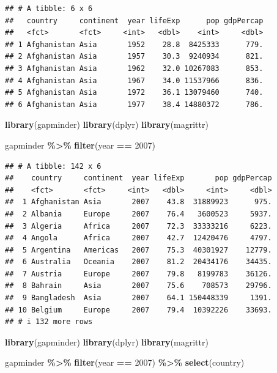 \documentclass[
]{book}
\newenvironment{Shaded}{\begin{snugshade}}{\end{snugshade}}
\newcommand{\DecValTok}[1]{\textcolor[rgb]{0.00,0.00,0.81}{#1}}
\newcommand{\FunctionTok}[1]{\textcolor[rgb]{0.13,0.29,0.53}{\textbf{#1}}}
\newcommand{\NormalTok}[1]{#1}
\newcommand{\SpecialCharTok}[1]{\textcolor[rgb]{0.81,0.36,0.00}{\textbf{#1}}}
\theoremstyle{definition}
\theoremstyle{definition}
\theoremstyle{definition}
\theoremstyle{definition}
\theoremstyle{remark}
\begin{document}
\begin{verbatim}
## # A tibble: 6 x 6
##   country     continent  year lifeExp      pop gdpPercap
##   <fct>       <fct>     <int>   <dbl>    <int>     <dbl>
## 1 Afghanistan Asia       1952    28.8  8425333      779.
## 2 Afghanistan Asia       1957    30.3  9240934      821.
## 3 Afghanistan Asia       1962    32.0 10267083      853.
## 4 Afghanistan Asia       1967    34.0 11537966      836.
## 5 Afghanistan Asia       1972    36.1 13079460      740.
## 6 Afghanistan Asia       1977    38.4 14880372      786.
\end{verbatim}

\begin{Shaded}
\begin{Highlighting}[]
\FunctionTok{library}\NormalTok{(gapminder)}
\FunctionTok{library}\NormalTok{(dplyr)}
\FunctionTok{library}\NormalTok{(magrittr)}

\NormalTok{gapminder }\SpecialCharTok{\%\textgreater{}\%}
  \FunctionTok{filter}\NormalTok{(year }\SpecialCharTok{==} \DecValTok{2007}\NormalTok{)}
\end{Highlighting}
\end{Shaded}

\begin{verbatim}
## # A tibble: 142 x 6
##    country     continent  year lifeExp       pop gdpPercap
##    <fct>       <fct>     <int>   <dbl>     <int>     <dbl>
##  1 Afghanistan Asia       2007    43.8  31889923      975.
##  2 Albania     Europe     2007    76.4   3600523     5937.
##  3 Algeria     Africa     2007    72.3  33333216     6223.
##  4 Angola      Africa     2007    42.7  12420476     4797.
##  5 Argentina   Americas   2007    75.3  40301927    12779.
##  6 Australia   Oceania    2007    81.2  20434176    34435.
##  7 Austria     Europe     2007    79.8   8199783    36126.
##  8 Bahrain     Asia       2007    75.6    708573    29796.
##  9 Bangladesh  Asia       2007    64.1 150448339     1391.
## 10 Belgium     Europe     2007    79.4  10392226    33693.
## # i 132 more rows
\end{verbatim}

\begin{Shaded}
\begin{Highlighting}[]
\FunctionTok{library}\NormalTok{(gapminder)}
\FunctionTok{library}\NormalTok{(dplyr)}
\FunctionTok{library}\NormalTok{(magrittr)}

\NormalTok{gapminder }\SpecialCharTok{\%\textgreater{}\%}
  \FunctionTok{filter}\NormalTok{(year }\SpecialCharTok{==} \DecValTok{2007}\NormalTok{) }\SpecialCharTok{\%\textgreater{}\%}
  \FunctionTok{select}\NormalTok{(country)}
\end{Highlighting}
\end{Shaded}
\end{document}
